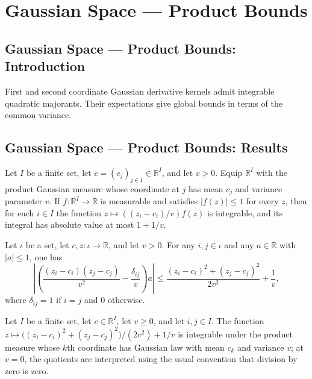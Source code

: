 \section{Gaussian Space --- Product Bounds}
\subsection*{Gaussian Space --- Product Bounds: Introduction}
First and second coordinate Gaussian derivative kernels admit integrable quadratic majorants. Their expectations give global bounds in terms of the common variance.

\subsection*{Gaussian Space --- Product Bounds: Results}

\begin{lemma}
\leanok
{}
Let $I$ be a finite set, let $c=(c_j)_{j\in I}\in\mathbb R^I$, and let $v>0$. Equip
$\mathbb R^I$ with the product Gaussian measure whose coordinate at $j$ has mean $c_j$
and variance parameter $v$. If $f:\mathbb R^I\to\mathbb R$ is measurable and satisfies
$|f(z)|\le1$ for every $z$, then for each $i\in I$ the function $z\mapsto
((z_i-c_i)/v)f(z)$ is integrable, and its integral has absolute value at most $1+1/v$.
\end{lemma}

\begin{lemma}
\leanok
{}
Let $\iota$ be a set, let $c,z\colon\iota\to\mathbb R$, and let $v>0$. For any
$i,j\in\iota$ and any $a\in\mathbb R$ with $|a|\le1$, one has
\[\left|\left(\frac{(z_i-c_i)(z_j-c_j)}{v^2}-\frac{\delta_{ij}}{v}\right)a\right|\le\frac{(z_i-c_i)^2+(z_j-c_j)^2}{2v^2}+\frac1v,\]
where $\delta_{ij}=1$ if $i=j$ and $0$ otherwise.
\end{lemma}

\begin{lemma}
\leanok
{}
Let $I$ be a finite set, let $c\in\mathbb R^I$, let $v\ge 0$, and let $i,j\in I$. The
function $z\mapsto\bigl((z_i-c_i)^2+(z_j-c_j)^2\bigr)/(2v^2)+1/v$ is integrable under
the product measure whose $k$th coordinate has Gaussian law with mean $c_k$ and variance
$v$; at $v=0$, the quotients are interpreted using the usual convention that division by
zero is zero.
\end{lemma}


